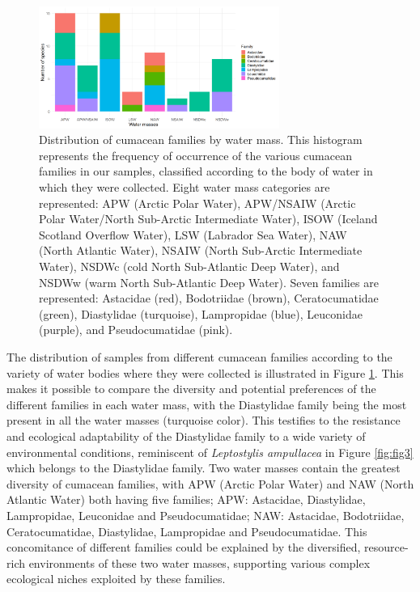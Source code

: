 \begin{figure}[htbp]
    \centering
    \includegraphics[width=0.7\textwidth]{figure3.png}
    \caption{Distribution of cumacean families by water mass. This histogram represents the frequency of occurrence of the various cumacean families in our samples, classified according to the body of water in which they were collected. Eight water mass categories are represented: APW (Arctic Polar Water), APW/NSAIW (Arctic Polar Water/North Sub-Arctic Intermediate Water), ISOW (Iceland Scotland Overflow Water), LSW (Labrador Sea Water), NAW (North Atlantic Water), NSAIW (North Sub-Arctic Intermediate Water), NSDWc (cold North Sub-Atlantic Deep Water), and NSDWw (warm North Sub-Atlantic Deep Water). Seven families are represented: Astacidae (red), Bodotriidae (brown), Ceratocumatidae (green), Diastylidae (turquoise), Lampropidae (blue), Leuconidae (purple), and Pseudocumatidae (pink). \label{fig:fig4}}
\end{figure}

The distribution of samples from different cumacean families according to the variety of water bodies where they were collected is illustrated in Figure \ref{fig:fig4}. This makes it possible to compare the diversity and potential preferences of the different families in each water mass, with the Diastylidae family being the most present in all the water masses (turquoise color). This testifies to the resistance and ecological adaptability of the Diastylidae family to a wide variety of environmental conditions, reminiscent of \emph{Leptostylis ampullacea} in Figure \ref{fig:fig3} which belongs to the Diastylidae family. Two water masses contain the greatest diversity of cumacean families, with APW (Arctic Polar Water) and NAW (North Atlantic Water) both having five families; APW: Astacidae, Diastylidae, Lampropidae, Leuconidae and Pseudocumatidae; NAW: Astacidae, Bodotriidae, Ceratocumatidae, Diastylidae, Lampropidae and Pseudocumatidae. This concomitance of different families could be explained by the diversified, resource-rich environments of these two water masses, supporting various complex ecological niches exploited by these families.

